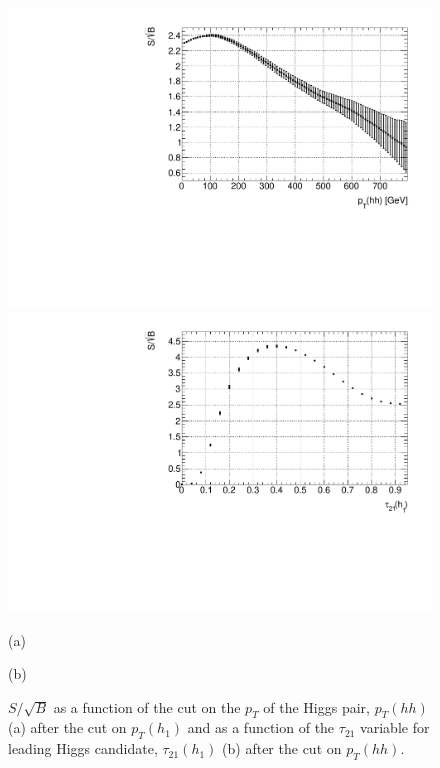 \begin{figure}
	\centering
	\begin{minipage}{.5\textwidth}
		\centering
		\includegraphics[trim={.6cm 0 0 0},clip,width=\linewidth]{./Figures/SSB_hh_pt.pdf}
	\end{minipage}%
	\begin{minipage}{.5\textwidth}
		\centering
		\includegraphics[trim={0 0 .65cm 0},clip,width=\linewidth]{./Figures/SSB_h1_tau21.pdf}
	\end{minipage}
	\begin{minipage}[t]{0.5\textwidth}
		\caption*{(a)}
	\end{minipage}%
	\hfill
	\begin{minipage}[t]{0.5\textwidth}
		\caption*{(b)}
	\end{minipage}
	\caption{$S/\sqrt{B}$ as a function of the cut on the $p_T$ of the Higgs pair, $p_T(hh)$ (a) after the cut on $p_T(h_1)$ and as a function of the $\tau_{21}$ variable for leading Higgs candidate, $\tau_{21}(h_1)$ (b) after the cut on $p_T(hh)$.}
	\label{fig:SSB_hh_pt}
\end{figure} 

